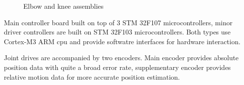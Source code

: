 \documentclass[letterpaper, 10 pt, conference]{ieeeconf}  %
\begin{document}
\begin{figure}[h]
\caption{Elbow and knee assemblies}
\label{img:joints}
\end{figure}

Main controller board built on top of 3 STM 32F107 microcontrollers, minor
driver controllers are built on STM 32F103 microcontrollers. Both types use
Cortex-M3 ARM cpu and provide softwatre interfaces for hardware interaction. 

Joint drives are accompanied by two encoders. Main encoder provides absolute
position data with quite a broad error rate, supplementary encoder provides
relative motion data for more accurate position estimation.
\end{document}

